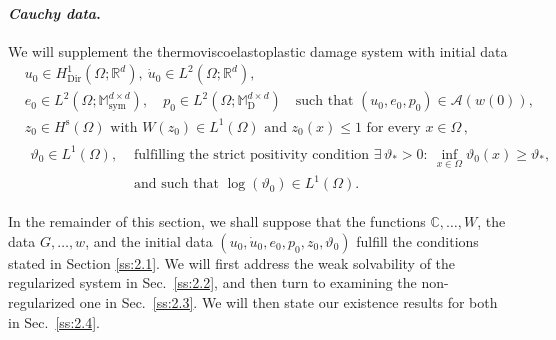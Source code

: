 \documentclass[a4paper,10pt,reqno]{amsart}
\numberwithin{equation}{section}
\newcommand{\bbM}{\mathbb{M}}
\newcommand{\R}{\mathbb{R}}
\numberwithin{equation}{section}
\newcommand{\teta}{\vartheta}
\newcommand{\Dir}{\mathrm{Dir}}
\newcommand{\bbC}{\mathbb{C}}
\newcommand{\mt}{\bbM}
\newcommand{\sym}{\mathrm{sym}}
\newcommand{\dev}{\mathrm{D}}
\newcommand{\spz}{H^{\mathrm{s}}(\Omega)}
\begin{document}
\paragraph{{\em Cauchy data}.} We will supplement the thermoviscoelastoplastic damage system with 
initial data
\begin{subequations}
\label{Cauchy-data}
\begin{align}
&
\label{initial-u}
u_0 \in H_\Dir^{1} (\Omega;\R^d), \ \dot{u}_0 \in L^2 (\Omega;\R^d),
\\
& 
\label{initial-p}
e_0 \in   L^2(\Omega;\mt_\sym^{d\times d}), \quad  p_0 \in L^2(\Omega;\mt_\dev^{d\times d}) \quad \text{such that } (u_0, e_0, p_0 ) \in \mathcal{A}(w(0)),
\\
&\label{initial-z}
z_0 \in \spz \text{ with } W(z_0) \in L^1(\Omega) \text{ and } z_0(x) \leq 1  \text{ for every } x \in \Omega\,,
\\
\label{initial-teta}
&
\begin{aligned}
\teta_0 \in L^1(\Omega),  &  \text{ fulfilling the strict positivity condition }  \exists\, \teta_*>0: \ \inf_{x\in \Omega} \teta_0(x) \geq \teta_*, \\ &  \text{ and such that } \log(\teta_0) \in L^1(\Omega).
\end{aligned}
\end{align}
\end{subequations} 
\par
In the remainder of  this section,  we shall suppose that the functions $\bbC, \ldots, W$, the data $G,\ldots, w$, and the initial data $(u_0, \dot{u}_0, e_0, p_0,z_0,\teta_0)$
 fulfill the conditions stated in Section \ref{ss:2.1}.
  We will first address the weak solvability of the regularized system in Sec.\ \ref{ss:2.2}, and then turn to examining the non-regularized one in Sec.\ \ref{ss:2.3}. We will then state our existence results for both in Sec.\ \ref{ss:2.4}. 
\end{document}
